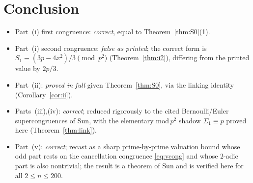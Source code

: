 \documentclass[12pt]{article}
\theoremstyle{remark}
\begin{document}
\section{Conclusion}

\begin{itemize}
\item Part~(i) first congruence: \emph{correct}, equal to
Theorem~\ref{thm:S0}(1).
\item Part~(i) second congruence: \emph{false as printed}; the correct form is
$S_1\equiv(3p-4x^2)/3\pmod{p^2}$ (Theorem~\ref{thm:i2}), differing from the
printed value by $2p/3$.
\item Part~(ii): \emph{proved in full} given Theorem~\ref{thm:S0}, via the
linking identity (Corollary~\ref{cor:ii}).
\item Parts~(iii),(iv): \emph{correct}; reduced rigorously to the cited
Bernoulli/Euler supercongruences of Sun, with the elementary mod\,$p^2$ shadow
$\Sigma_1\equiv p$ proved here (Theorem~\ref{thm:link}).
\item Part~(v): \emph{correct}; recast as a sharp prime-by-prime valuation
bound whose odd part rests on the cancellation congruence \eqref{eq:vcong} and
whose $2$-adic part is also nontrivial; the result is a theorem of Sun and is
verified here for all $2\le n\le200$.
\end{itemize}
\end{document}
